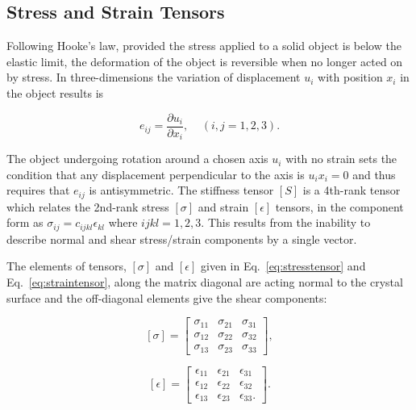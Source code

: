 \subsection{Stress and Strain Tensors}
\label{sec:stressandstrain}
Following Hooke's law, provided the stress applied to a solid object is below the elastic limit, the deformation of the object is reversible when no longer acted on by stress. In three-dimensions the variation of displacement $u_{i}$ with position $x_{i}$ in the object results is

\begin{equation}
\label{eq:generalmatrixnotation}
e_{ij}=\frac{\partial u_{i}}{\partial x_{i}}, \;\;\;\; (i,j = 1,2,3).
\end{equation} 

\noindent The object undergoing rotation around a chosen axis $u_{i}$ with no strain sets the condition that any displacement perpendicular to the axis is $u_{i}x_{i}=0$ and thus requires that $e_{ij}$ is antisymmetric. The stiffness tensor $[S]$ is a 4th-rank tensor which relates the 2nd-rank stress $[\sigma]$ and strain $[\epsilon]$ tensors, in the component form as $\sigma_{ij}=c_{ijkl}\epsilon_{kl}$ where $ijkl=1,2,3$. This results from the inability to describe normal and shear stress/strain components by a single vector. 

The elements of tensors, $[\sigma]$ and $[\epsilon]$ given in Eq.~\ref{eq:stresstensor} and Eq.~\ref{eq:straintensor}, along the matrix diagonal are acting normal to the crystal surface and the off-diagonal elements give the shear components:     

\begin{equation}
\label{eq:stresstensor}
[\sigma]=\begin{bmatrix}
\sigma_{11} & \sigma_{21} & \sigma_{31} \\ 
\sigma_{12} & \sigma_{22}  & \sigma_{32}\\ 
\sigma_{13} & \sigma_{23} & \sigma_{33}
\end{bmatrix},
\end{equation} 

\begin{equation}
\label{eq:straintensor}
[\epsilon]=\begin{bmatrix}
\epsilon_{11} & \epsilon_{21} & \epsilon_{31} \\ 
\epsilon_{12} & \epsilon_{22}  & \epsilon_{32}\\ 
\epsilon_{13} & \epsilon_{23} & \epsilon_{33}.
\end{bmatrix}.
\end{equation} 


